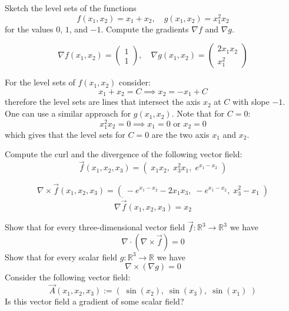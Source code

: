 \documentclass[11pt]{article}
\begin{document}


\begin{exercise}
	Sketch the level sets of the functions 
    \[
        f(x_1,x_2) = x_1 + x_2, \quad g(x_1,x_2) = x_1^2 x_2 
    \]
    for the values $0$, $1$, and $-1$.
    Compute the gradients $\nabla f$ and  $\nabla g$.
\end{exercise}

\begin{solution}
    \[
        \nabla f(x_1,x_2) = \begin{pmatrix} 1\\ 1 \end{pmatrix}, \quad \nabla g(x_1,x_2) =  \begin{pmatrix} 2x_1x_2\\ x_1^2 \end{pmatrix}
    \]


For the level sets of $f(x_1,x_2)$ consider:
    \[
        x_1 + x_2 = C \implies x_2 = -x_1 + C
    \]
therefore the level sets are lines that intersect the axis $x_2$ at $C$ with slope $-1$. One can use a similar approach for $g(x_1,x_2)$. Note that for $C =0$:
    \[
        x_1^2 x_2 = 0 \implies x_1 =0 \text{ or } x_2 = 0
    \]
which gives that the level sets for $C = 0$ are the two axis $x_1$ and $x_2$. 
\end{solution}


\begin{exercise}
	Compute the curl and the divergence of the following vector field:
    \[
        \vec{f}(x_1,x_2,x_3) = \left( \; x_1 x_2, \; x_3^2 x_1,\;  e^{x_1 - x_2} \; \right)
    \]
\end{exercise}

\begin{solution}
    \[
        \nabla \times \vec{f}(x_1,x_2,x_3) = \left( \; -e^{x_1-x_2} - 2x_1x_3, \; -e^{x_1-x_2},\;  x_3^2 - x_1 \; \right)
    \]
   \[
        \nabla \dot \vec{f}(x_1,x_2,x_3) = x_2
    \]
\end{solution}





\begin{exercise}
	Show that for every three-dimensional vector field $\vec{f} \colon \mathbb{R}^3 \to \mathbb{R}^3$ we have 
    \[
        \nabla \cdot \left( \nabla \times \vec{f} \right) = 0
    \]
    Show that for every scalar field $g \colon \mathbb{R}^3 \to \mathbb{R}$ we have 
    \[
        \nabla \times \left( \nabla g \right) = 0
    \]
    Consider the following vector field:
    \[
        \vec{A}(x_1,x_2,x_3) := \left( \; \sin(x_2),  \; \sin(x_3), \; \sin(x_1) \; \right)
    \]
    Is this vector field a gradient of some scalar field?
\end{exercise}
\end{document}
